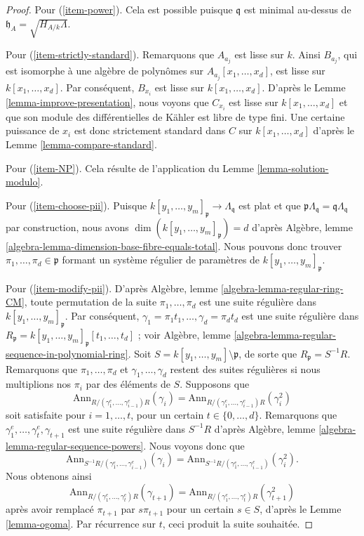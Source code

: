 \begin{proof}
\medskip\noindent
Pour (\ref{item-power}). Cela est possible puisque $\mathfrak q$ est minimal
au-dessus de $\mathfrak h_A = \sqrt{H_{A/k}\Lambda}$.

\medskip\noindent
Pour (\ref{item-strictly-standard}). Remarquons que $A_{a_j}$ est lisse
sur $k$. Ainsi $B_{a_j}$, qui est isomorphe à une algèbre de polynômes
sur $A_{a_j}[x_1, \ldots, x_d]$, est lisse sur
$k[x_1, \ldots, x_d]$. Par conséquent, $B_{x_i}$ est lisse sur $k[x_1, \ldots, x_d]$.
D'après le Lemme \ref{lemma-improve-presentation},
nous voyons que $C_{x_i}$ est lisse sur $k[x_1, \ldots, x_d]$
et que son module des différentielles de Kähler est libre de type fini. Une certaine puissance de
$x_i$ est donc strictement standard dans $C$ sur $k[x_1, \ldots, x_d]$
d'après le Lemme \ref{lemma-compare-standard}.

\medskip\noindent
Pour (\ref{item-NP}). Cela résulte de l'application du Lemme \ref{lemma-solution-modulo}.

\medskip\noindent
Pour (\ref{item-choose-pii}). Puisque
$k[y_1, \ldots, y_m]_\mathfrak p \to \Lambda_\mathfrak q$
est plat et que $\mathfrak p \Lambda_\mathfrak q = \mathfrak q \Lambda_\mathfrak q$
par construction,
nous avons $\dim(k[y_1, \ldots, y_m]_\mathfrak p) = d$ d'après
Algèbre, lemme \ref{algebra-lemma-dimension-base-fibre-equals-total}.
Nous pouvons donc trouver $\pi_1, \ldots, \pi_d \in \mathfrak p$ formant
un système régulier de paramètres de $k[y_1, \ldots, y_m]_\mathfrak p$.

\medskip\noindent
Pour (\ref{item-modify-pii}). D'après
Algèbre, lemme \ref{algebra-lemma-regular-ring-CM},
toute permutation de la suite $\pi_1, \ldots, \pi_d$ est une
suite régulière dans $k[y_1, \ldots, y_m]_\mathfrak p$. Par conséquent,
$\gamma_1 = \pi_1 t_1, \ldots, \gamma_d = \pi_d t_d$ est une suite
régulière dans
$R_\mathfrak p = k[y_1, \ldots, y_m]_\mathfrak p[t_1, \ldots, t_d]$ ; voir
Algèbre, lemme \ref{algebra-lemma-regular-sequence-in-polynomial-ring}.
Soit $S = k[y_1, \ldots, y_m] \setminus \mathfrak p$, de sorte que
$R_\mathfrak p = S^{-1}R$. Remarquons que $\pi_1, \ldots, \pi_d$
et $\gamma_1, \ldots, \gamma_d$
restent des suites régulières si nous multiplions nos $\pi_i$ par des éléments de $S$.
Supposons que
$$
\text{Ann}_{R/(\gamma_1^e, \ldots, \gamma_{i - 1}^e)R}(\gamma_i)
=
\text{Ann}_{R/(\gamma_1^e, \ldots, \gamma_{i - 1}^e)R}(\gamma_i^2)
$$
soit satisfaite pour $i = 1, \ldots, t$, pour un certain $t \in \{0, \ldots, d\}$. Remarquons que
$\gamma_1^e, \ldots, \gamma_t^e, \gamma_{t + 1}$ est une
suite régulière dans $S^{-1}R$ d'après
Algèbre, lemme \ref{algebra-lemma-regular-sequence-powers}.
Nous voyons donc que
$$
\text{Ann}_{S^{-1}R/(\gamma_1^e, \ldots, \gamma_{i - 1}^e)}(\gamma_i) =
\text{Ann}_{S^{-1}R/(\gamma_1^e, \ldots, \gamma_{i - 1}^e)}(\gamma_i^2).
$$
Nous obtenons ainsi
$$
\text{Ann}_{R/(\gamma_1^e, \ldots, \gamma_t^e)R}(\gamma_{t + 1})
=
\text{Ann}_{R/(\gamma_1^e, \ldots, \gamma_t^e)R}(\gamma_{t + 1}^2)
$$
après avoir remplacé $\pi_{t + 1}$ par $s\pi_{t + 1}$ pour un certain $s \in S$, d'après le
Lemme \ref{lemma-ogoma}. Par récurrence sur $t$, ceci produit la
suite souhaitée.


\end{proof}
